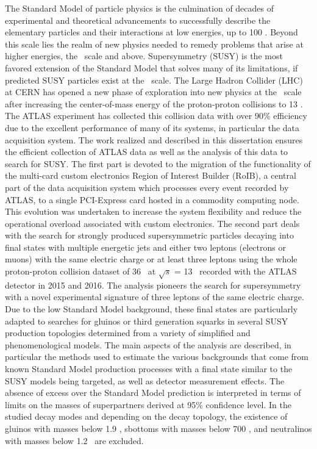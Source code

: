The Standard Model of particle physics is the culmination of decades of experimental and theoretical advancements
to successfully describe the elementary particles and their interactions at low energies, up to 100 \GeV. 
Beyond this scale lies the realm of new physics needed to remedy problems that arise at higher energies, the \TeV~scale and above. 
Supersymmetry (SUSY) is the most favored extension of the Standard Model that solves many of its limitations, if predicted 
SUSY particles exist at the \TeV~scale.
The Large Hadron Collider (LHC) at CERN has opened a new phase of exploration into new physics at the \TeV~scale 
after increasing the center-of-mass energy of the proton-proton collisions to 13 \TeV. 
The ATLAS experiment has collected this collision data with over 90\% efficiency due to the excellent performance 
of many of its systems, in particular the data acquisition system.
The work realized and described in this dissertation ensures the efficient collection of ATLAS data as well as the analysis 
of this data to search for SUSY.
The first part is devoted to the migration of the functionality of the multi-card custom electronics 
Region of Interest Builder (RoIB), a central part of the data acquisition system which processes every event recorded by ATLAS, to a single 
PCI-Express card hosted in a commodity computing node. This evolution was undertaken to 
increase the system flexibility and reduce the operational overload associated with custom electronics.
The second part deals with the search for strongly produced supersymmetric particles decaying into final 
states with multiple energetic jets and either two leptons (electrons or muons) with the same electric 
charge or at least three leptons using the whole proton-proton collision dataset of 36 \ifb~at 
$\sqrt{s}$ = 13 \TeV~recorded with the ATLAS detector in 2015 and 2016.
The analysis pioneers the search for supersymmetry with a novel experimental signature of three leptons of the same 
electric charge.
Due to the low Standard Model background, these final states are particularly adapted to searches for gluinos or third generation
squarks in several SUSY production topologies determined from a variety of simplified and phenomenological models.
The main aspects of the analysis are described, in particular the methods used to estimate the various backgrounds that come 
from known Standard Model production processes with a final state similar to the SUSY models being targeted, 
as well as detector measurement effects.
The absence of excess over the Standard Model prediction  is interpreted in 
terms of limits on the masses of superpartners derived at 95\% confidence 
level. In the studied decay modes and depending on the decay topology, the existence of gluinos with masses below
1.9 \TeV, sbottoms with masses below 700 \GeV, and neutralinos with masses 
below 1.2 \TeV~are excluded.
